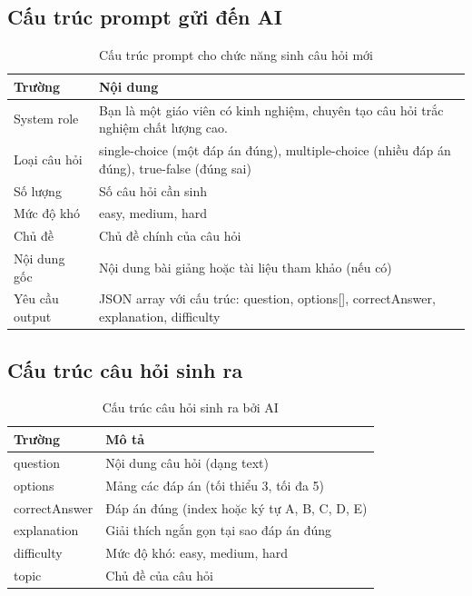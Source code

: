 ﻿\documentclass[../DoAn.tex]{subfiles}
\begin{document}
\subsection{Cấu trúc prompt gửi đến AI}
\begin{table}[H]
\centering
\begin{tabular}{|p{3cm}|p{10cm}|}
\hline
\textbf{Trường} & \textbf{Nội dung} \\ \hline
System role & Bạn là một giáo viên có kinh nghiệm, chuyên tạo câu hỏi trắc nghiệm chất lượng cao. \\ \hline
Loại câu hỏi & single-choice (một đáp án đúng), multiple-choice (nhiều đáp án đúng), true-false (đúng sai) \\ \hline
Số lượng & Số câu hỏi cần sinh \\ \hline
Mức độ khó & easy, medium, hard \\ \hline
Chủ đề & Chủ đề chính của câu hỏi \\ \hline
Nội dung gốc & Nội dung bài giảng hoặc tài liệu tham khảo (nếu có) \\ \hline
Yêu cầu output & JSON array với cấu trúc: question, options[], correctAnswer, explanation, difficulty \\ \hline
\end{tabular}
\caption{Cấu trúc prompt cho chức năng sinh câu hỏi mới}
\label{table:ai_gen_new_prompt}
\end{table}

\subsection{Cấu trúc câu hỏi sinh ra}
\begin{table}[H]
\centering
\begin{tabular}{|p{3cm}|p{10cm}|}
\hline
\textbf{Trường} & \textbf{Mô tả} \\ \hline
question & Nội dung câu hỏi (dạng text) \\ \hline
options & Mảng các đáp án (tối thiểu 3, tối đa 5) \\ \hline
correctAnswer & Đáp án đúng (index hoặc ký tự A, B, C, D, E) \\ \hline
explanation & Giải thích ngắn gọn tại sao đáp án đúng \\ \hline
difficulty & Mức độ khó: easy, medium, hard \\ \hline
topic & Chủ đề của câu hỏi \\ \hline
\end{tabular}
\caption{Cấu trúc câu hỏi sinh ra bởi AI}
\label{table:ai_gen_new_output}
\end{table}
\end{document}
